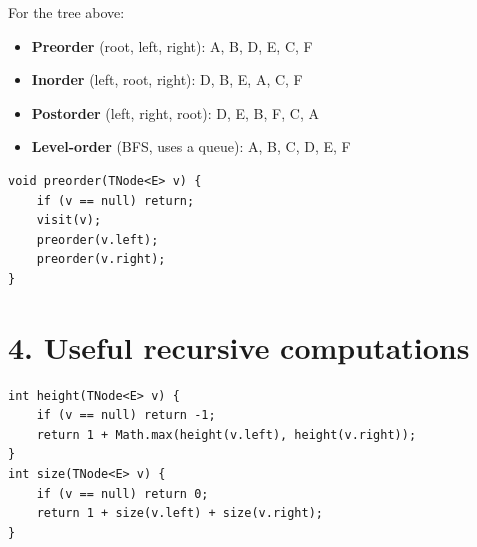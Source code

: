 \documentclass[11pt]{article}
\begin{document}
\begin{center}
\end{center}

For the tree above:
\begin{itemize}[leftmargin=*]
  \item \textbf{Preorder} (root, left, right): A, B, D, E, C, F
  \item \textbf{Inorder} (left, root, right): D, B, E, A, C, F
  \item \textbf{Postorder} (left, right, root): D, E, B, F, C, A
  \item \textbf{Level-order} (BFS, uses a queue): A, B, C, D, E, F
\end{itemize}

\begin{lstlisting}
void preorder(TNode<E> v) {
    if (v == null) return;
    visit(v);
    preorder(v.left);
    preorder(v.right);
}
\end{lstlisting}

\section*{4. Useful recursive computations}

\begin{lstlisting}
int height(TNode<E> v) {
    if (v == null) return -1;
    return 1 + Math.max(height(v.left), height(v.right));
}
int size(TNode<E> v) {
    if (v == null) return 0;
    return 1 + size(v.left) + size(v.right);
}
\end{lstlisting}
\end{document}
